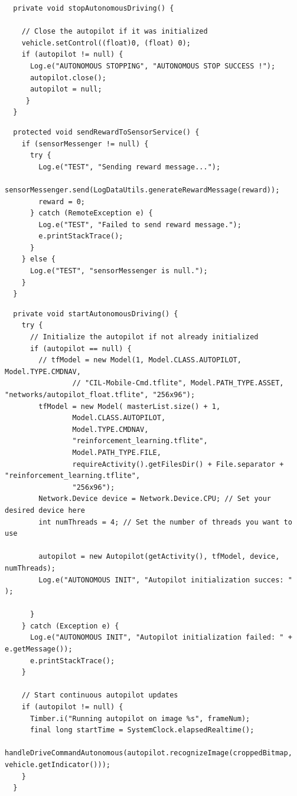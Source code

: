 \documentclass[12pt]{report}
\begin{document}
\begin{lstlisting}
  private void stopAutonomousDriving() {

    // Close the autopilot if it was initialized
    vehicle.setControl((float)0, (float) 0);
    if (autopilot != null) {
      Log.e("AUTONOMOUS STOPPING", "AUTONOMOUS STOP SUCCESS !");
      autopilot.close();
      autopilot = null;
     }
  }
\end{lstlisting}

\begin{lstlisting}
  protected void sendRewardToSensorService() {
    if (sensorMessenger != null) {
      try {
        Log.e("TEST", "Sending reward message...");
        sensorMessenger.send(LogDataUtils.generateRewardMessage(reward));
        reward = 0;
      } catch (RemoteException e) {
        Log.e("TEST", "Failed to send reward message.");
        e.printStackTrace();
      }
    } else {
      Log.e("TEST", "sensorMessenger is null.");
    }
  }
\end{lstlisting}

\begin{lstlisting}
  private void startAutonomousDriving() {
    try {
      // Initialize the autopilot if not already initialized
      if (autopilot == null) {
        // tfModel = new Model(1, Model.CLASS.AUTOPILOT, Model.TYPE.CMDNAV,
                // "CIL-Mobile-Cmd.tflite", Model.PATH_TYPE.ASSET, "networks/autopilot_float.tflite", "256x96");
        tfModel = new Model( masterList.size() + 1,
                Model.CLASS.AUTOPILOT,
                Model.TYPE.CMDNAV,
                "reinforcement_learning.tflite",
                Model.PATH_TYPE.FILE,
                requireActivity().getFilesDir() + File.separator + "reinforcement_learning.tflite",
                "256x96");
        Network.Device device = Network.Device.CPU; // Set your desired device here
        int numThreads = 4; // Set the number of threads you want to use

        autopilot = new Autopilot(getActivity(), tfModel, device, numThreads);
        Log.e("AUTONOMOUS INIT", "Autopilot initialization succes: " );

      }
    } catch (Exception e) {
      Log.e("AUTONOMOUS INIT", "Autopilot initialization failed: " + e.getMessage());
      e.printStackTrace();
    }

    // Start continuous autopilot updates
    if (autopilot != null) {
      Timber.i("Running autopilot on image %s", frameNum);
      final long startTime = SystemClock.elapsedRealtime();
      handleDriveCommandAutonomous(autopilot.recognizeImage(croppedBitmap, vehicle.getIndicator()));
    }
  }
\end{lstlisting}
\end{document}
